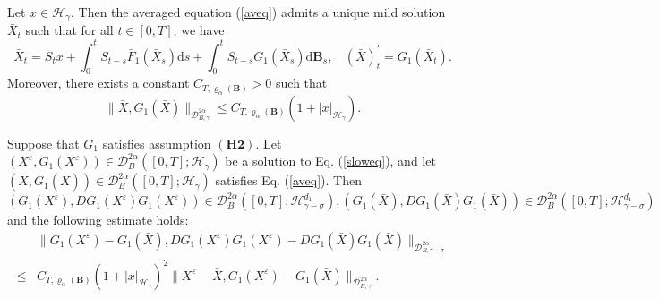 \documentclass[10pt,a4paper]{amsart}
\begin{document}
\begin{lemma}\label{barXest}
	Let $ x \in \mathcal{H}_\gamma $. Then the averaged equation (\ref{aveq}) admits a unique mild solution $\bar{X}_t$ such that for all $t \in [0,T]$, we have
	\begin{equation*}
	\bar{X}_t = S_t x + \int_0^t S_{t-s} \bar{F}_1(\bar{X}_s) \mathrm{d} s + \int_0^t S_{t-s} G_1(\bar{X}_s)  \mathrm{d} \mathbf B_s, ~~~~(\bar{X})_t^\prime=G_1(\bar{X}_t).	
	\end{equation*}
	Moreover, there exists a constant $ C_{T,\varrho_{\alpha}(\mathbf{B})} > 0 $ such that
	\begin{equation*}
		\|\bar{X},G_1(\bar{X})\|_{\mathcal{D}_{B,\gamma}^{2\alpha}} \leq  C_{T,\varrho_{\alpha}(\mathbf{B})} (1+|x|_{\mathcal H_\gamma}) .
	\end{equation*}
\end{lemma}

\begin{lemma}\label{Glem2}
Suppose that $G_1$ satisfies assumption $(\mathbf{H2})$.
Let $(X^\varepsilon,G_1(X^\varepsilon)) \in \mathcal{D}_{B}^{2\alpha}([0,T];\mathcal H_\gamma)$ be a solution to Eq. (\ref{sloweq}), and let $(\bar{X},G_1(\bar{X})) \in \mathcal{D}_{B}^{2\alpha}([0,T];\mathcal H_\gamma)$ satisfies Eq. (\ref{aveq}). Then $(G_1(X^\varepsilon),DG_1(X^\varepsilon)G_1(X^\varepsilon)) \in \mathcal{D}_{B}^{2\alpha}([0,T];\mathcal H_{\gamma-\sigma}^{d_1}), (G_1(\bar{X}),DG_1(\bar{X})G_1(\bar{X})) \in \mathcal{D}_{B}^{2\alpha}([0,T];\mathcal H_{\gamma-\sigma}^{d_1})$ and the following estimate holds:
\begin{align}\label{DGG}
	& \|G_1(X^\varepsilon)-G_1(\bar{X}),DG_1(X^\varepsilon)G_1(X^\varepsilon)-DG_1(\bar{X})G_1(\bar{X})\|_{\mathcal{D}_{B,\gamma-\sigma}^{2\alpha} }  \nonumber\\
	\leq & C_{T,\varrho_{\alpha}(\mathbf{B})} (1+|x|_{\mathcal H_\gamma})^2 \|X^\varepsilon-\bar{X},G_1(X^\varepsilon)-G_1(\bar{X}) \|_{\mathcal{D}_{B,\gamma}^{2\alpha}}.
\end{align}
\end{lemma}
\end{document}
